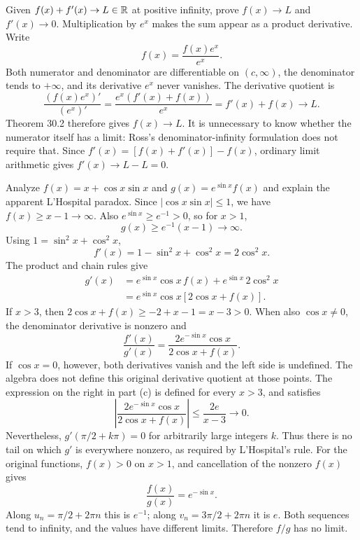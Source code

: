 \goal Given $f(x)+f'(x)\to L\in\mathbb{R}$ at positive infinity, prove $f(x)\to L$ and $f'(x)\to0$.
\idea Multiplication by $e^x$ makes the sum appear as a product derivative.
Write
\[
 f(x)=\frac{f(x)e^x}{e^x}.
\]
Both numerator and denominator are differentiable on $(c,\infty)$, the denominator tends to $+\infty$, and its derivative $e^x$ never vanishes. The derivative quotient is
\[
 \frac{(f(x)e^x)'}{(e^x)'}
 =\frac{e^x(f'(x)+f(x))}{e^x}
 =f'(x)+f(x)\longrightarrow L.
\]
Theorem 30.2 therefore gives $f(x)\to L$. It is unnecessary to know whether the numerator itself has a limit: Ross's denominator-infinity formulation does not require that.
Since $f'(x)=[f(x)+f'(x)]-f(x)$, ordinary limit arithmetic gives $f'(x)\to L-L=0$.

\goal Analyze $f(x)=x+\cos x\sin x$ and $g(x)=e^{\sin x}f(x)$ and explain the apparent L'Hospital paradox.
Since $|\cos x\sin x|\le1$, we have $f(x)\ge x-1\to\infty$. Also $e^{\sin x}\ge e^{-1}>0$, so for $x>1$,
\[
 g(x)\ge e^{-1}(x-1)\longrightarrow\infty.
\]
Using $1=\sin^2x+\cos^2x$,
\[
 f'(x)=1-\sin^2x+\cos^2x=2\cos^2x.
\]
The product and chain rules give
\begin{align*}
 g'(x)&=e^{\sin x}\cos x\,f(x)+e^{\sin x}\,2\cos^2x\\
 &=e^{\sin x}\cos x[2\cos x+f(x)].
\end{align*}
If $x>3$, then $2\cos x+f(x)\ge-2+x-1=x-3>0$. When also $\cos x\ne0$, the denominator derivative is nonzero and
\[
 \frac{f'(x)}{g'(x)}=
 \frac{2e^{-\sin x}\cos x}{2\cos x+f(x)}.
\]
If $\cos x=0$, however, both derivatives vanish and the left side is undefined. The algebra does not define this original derivative quotient at those points.
The expression on the right in part (c) is defined for every $x>3$, and satisfies
\[
 \left|\frac{2e^{-\sin x}\cos x}{2\cos x+f(x)}\right|
 \le\frac{2e}{x-3}\longrightarrow0.
\]
Nevertheless, $g'(\pi/2+k\pi)=0$ for arbitrarily large integers $k$. Thus there is no tail on which $g'$ is everywhere nonzero, as required by L'Hospital's rule.
For the original functions, $f(x)>0$ on $x>1$, and cancellation of the nonzero $f(x)$ gives
\[
 \frac{f(x)}{g(x)}=e^{-\sin x}.
\]
Along $u_n=\pi/2+2\pi n$ this is $e^{-1}$; along $v_n=3\pi/2+2\pi n$ it is $e$. Both sequences tend to infinity, and the values have different limits. Therefore $f/g$ has no limit.
